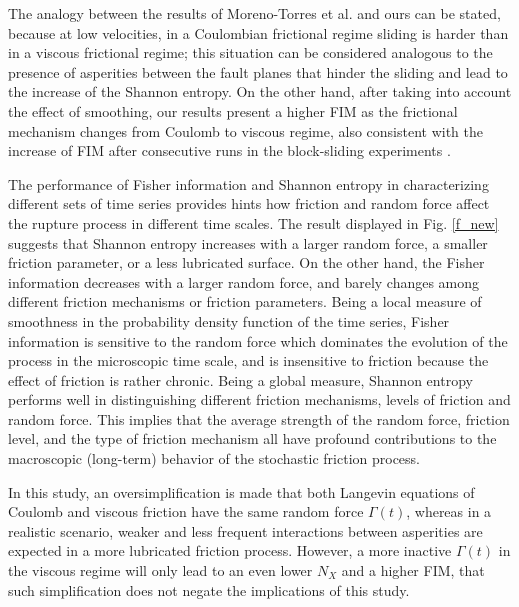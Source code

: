 \documentclass[%
 aip,
rsi,%
 amsmath,amssymb,
 reprint,%
]{revtex4-1}
\begin{document}
The analogy between the results of Moreno-Torres et al.  \cite{moreno-torres_investigating_2018} and ours can be stated, because at low velocities, in a Coulombian frictional regime sliding is harder than in a viscous frictional regime; this situation can be considered analogous to the presence of asperities between the fault planes that hinder the sliding and lead to the increase of the Shannon entropy. On the other hand, after taking into account the effect of smoothing, our results present a higher FIM as the frictional mechanism changes from Coulomb to viscous regime, also consistent with the increase of FIM after consecutive runs in the block-sliding experiments \cite{moreno-torres_investigating_2018}.

The performance of Fisher information and Shannon entropy in characterizing different sets of time series provides hints how friction and random force affect the rupture process in different time scales.
The result displayed in Fig. \ref{f_new} suggests that Shannon entropy increases with a larger random force, a smaller friction parameter, or a less lubricated surface.
On the other hand, the Fisher information decreases with a larger random force, and barely changes among different friction mechanisms or friction parameters.
Being a local measure of smoothness in the probability density function of the time series, Fisher information is sensitive to the random force which dominates the evolution of the process in the microscopic time scale, and is insensitive to friction because the effect of friction is rather chronic.
Being a global measure, Shannon entropy performs well in distinguishing different friction mechanisms, levels of friction and random force.
This implies that the average strength of the random force, friction level, and the type of friction mechanism all have profound contributions to the macroscopic (long-term) behavior of the stochastic friction process.

In this study, an oversimplification is made that both Langevin equations of Coulomb and viscous friction have the same random force $\Gamma (t)$, whereas in a realistic scenario, weaker and less frequent interactions between asperities are expected in a more lubricated friction process.
However, a more inactive $\Gamma (t)$ in the viscous regime will only lead to an even lower $N_X$ and a higher FIM, that such simplification does not negate the implications of this study.
\end{document}
